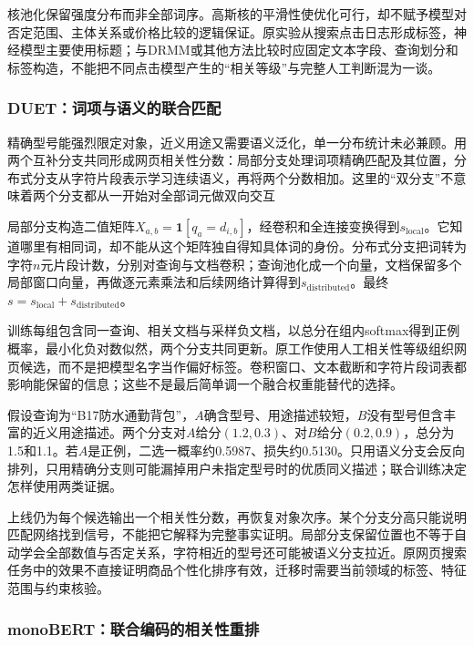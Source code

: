 核池化保留强度分布而非全部词序。高斯核的平滑性使优化可行，却不赋予模型对否定范围、主体关系或价格比较的逻辑保证。原实验从搜索点击日志形成标签，神经模型主要使用标题；与DRMM或其他方法比较时应固定文本字段、查询划分和标签构造，不能把不同点击模型产生的“相关等级”与完整人工判断混为一谈。

\Needspace{100mm}
\subsubsection{DUET：词项与语义的联合匹配}
\label{sec:rs-search-duet}

精确型号能强烈限定对象，近义用途又需要语义泛化，单一分布统计未必兼顾。用两个互补分支共同形成网页相关性分数：局部分支处理词项精确匹配及其位置，分布式分支从字符片段表示学习连续语义，再将两个分数相加。这里的“双分支”不意味着两个分支都从一开始对全部词元做双向交互

局部分支构造二值矩阵$X_{a,b}=\mathbf1[q_a=d_{i,b}]$，经卷积和全连接变换得到$s_{\mathrm{local}}$。它知道哪里有相同词，却不能从这个矩阵独自得知具体词的身份。分布式分支把词转为字符$n$元片段计数，分别对查询与文档卷积；查询池化成一个向量，文档保留多个局部窗口向量，再做逐元素乘法和后续网络计算得到$s_{\mathrm{distributed}}$。最终$s=s_{\mathrm{local}}+s_{\mathrm{distributed}}$。

训练每组包含同一查询、相关文档与采样负文档，以总分在组内softmax得到正例概率，最小化负对数似然，两个分支共同更新。原工作使用人工相关性等级组织网页候选，而不是把模型名字当作偏好标签。卷积窗口、文本截断和字符片段词表都影响能保留的信息；这些不是最后简单调一个融合权重能替代的选择。

假设查询为“B17防水通勤背包”，$A$确含型号、用途描述较短，$B$没有型号但含丰富的近义用途描述。两个分支对$A$给分$(1.2,0.3)$、对$B$给分$(0.2,0.9)$，总分为1.5和1.1。若$A$是正例，二选一概率约0.5987、损失约0.5130。只用语义分支会反向排列，只用精确分支则可能漏掉用户未指定型号时的优质同义描述；联合训练决定怎样使用两类证据。

上线仍为每个候选输出一个相关性分数，再恢复对象次序。某个分支分高只能说明匹配网络找到信号，不能把它解释为完整事实证明。局部分支保留位置也不等于自动学会全部数值与否定关系，字符相近的型号还可能被语义分支拉近。原网页搜索任务中的效果不直接证明商品个性化排序有效，迁移时需要当前领域的标签、特征范围与约束核验。

\Needspace{100mm}
\subsubsection{monoBERT：联合编码的相关性重排}
\label{sec:rs-search-monobert}

